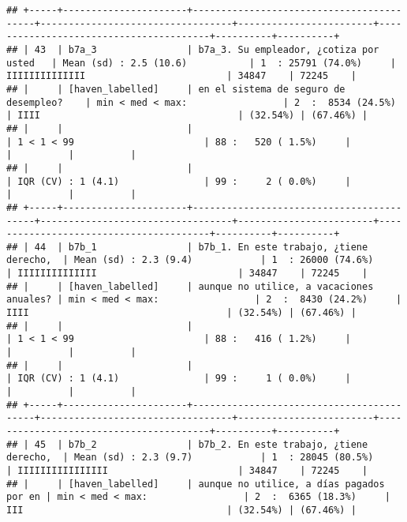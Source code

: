 \documentclass[]{article}
\begin{document}
\begin{verbatim}
## +-----+----------------------+------------------------------------------+----------------------------------+------------------------+----------------------------------------+----------+----------+
## | 43  | b7a_3                | b7a_3. Su empleador, ¿cotiza por usted   | Mean (sd) : 2.5 (10.6)           | 1  : 25791 (74.0%)     | IIIIIIIIIIIIII                         | 34847    | 72245    |
## |     | [haven_labelled]     | en el sistema de seguro de desempleo?    | min < med < max:                 | 2  :  8534 (24.5%)     | IIII                                   | (32.54%) | (67.46%) |
## |     |                      |                                          | 1 < 1 < 99                       | 88 :   520 ( 1.5%)     |                                        |          |          |
## |     |                      |                                          | IQR (CV) : 1 (4.1)               | 99 :     2 ( 0.0%)     |                                        |          |          |
## +-----+----------------------+------------------------------------------+----------------------------------+------------------------+----------------------------------------+----------+----------+
## | 44  | b7b_1                | b7b_1. En este trabajo, ¿tiene derecho,  | Mean (sd) : 2.3 (9.4)            | 1  : 26000 (74.6%)     | IIIIIIIIIIIIII                         | 34847    | 72245    |
## |     | [haven_labelled]     | aunque no utilice, a vacaciones anuales? | min < med < max:                 | 2  :  8430 (24.2%)     | IIII                                   | (32.54%) | (67.46%) |
## |     |                      |                                          | 1 < 1 < 99                       | 88 :   416 ( 1.2%)     |                                        |          |          |
## |     |                      |                                          | IQR (CV) : 1 (4.1)               | 99 :     1 ( 0.0%)     |                                        |          |          |
## +-----+----------------------+------------------------------------------+----------------------------------+------------------------+----------------------------------------+----------+----------+
## | 45  | b7b_2                | b7b_2. En este trabajo, ¿tiene derecho,  | Mean (sd) : 2.3 (9.7)            | 1  : 28045 (80.5%)     | IIIIIIIIIIIIIIII                       | 34847    | 72245    |
## |     | [haven_labelled]     | aunque no utilice, a días pagados por en | min < med < max:                 | 2  :  6365 (18.3%)     | III                                    | (32.54%) | (67.46%) |

\end{verbatim}
\end{document}
